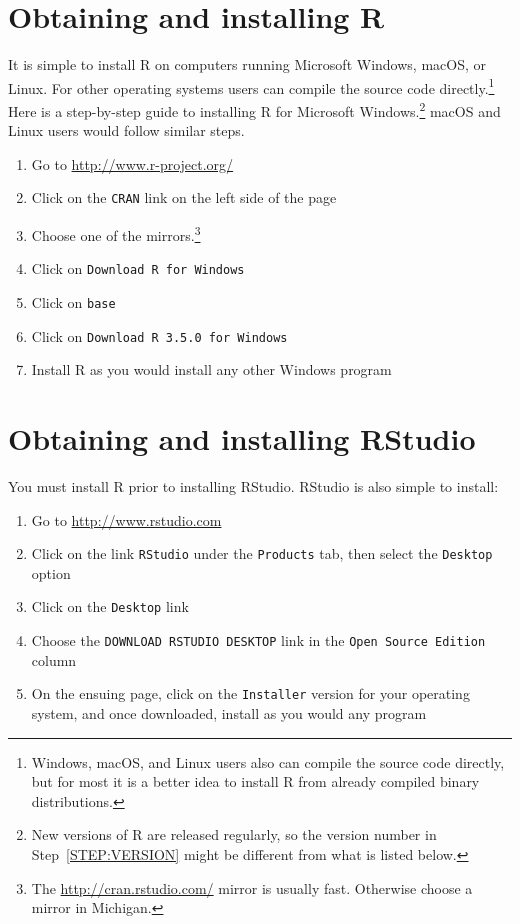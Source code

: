 \documentclass[12pt,oneside]{book}\usepackage[]{graphicx}\usepackage[]{color}
\newcommand{\be}{\begin{enumerate}}
\newcommand{\ee}{\end{enumerate}}
\begin{document}
\section{Obtaining and installing R}
It is simple to install R on computers running Microsoft Windows, macOS, or Linux. For other operating systems users can compile the source code directly.\footnote{Windows, macOS, and Linux users also can compile the source code directly, but for most it is a better idea to install R from already compiled binary distributions.}
Here is a step-by-step guide to installing R for Microsoft Windows.\footnote{New versions of R are released regularly, so the version number in Step~\ref{STEP:VERSION} might be different from what is listed below.} macOS and Linux users would follow similar steps.
\be
  \item Go to \url{http://www.r-project.org/}
  \item Click on the \texttt{CRAN} link on the left side of the page
  \item Choose one of the mirrors.\footnote{The \url{http://cran.rstudio.com/} mirror is usually fast. Otherwise choose a mirror in Michigan.}
  \item Click on \texttt{Download R for Windows}
  \item Click on \texttt{base}
  \item \label{STEP:VERSION} Click on \texttt{Download R 3.5.0 for Windows}
  \item Install R as you would install any other Windows program
\ee
\section{Obtaining and installing RStudio}

You must install R prior to installing RStudio. RStudio is also simple to install:
\begin{enumerate}
  \item Go to \url{http://www.rstudio.com}
  \item Click on the link \texttt{RStudio} under the \texttt{Products} tab, then select the \texttt{Desktop} option
  \item Click on the \texttt{Desktop} link
  \item Choose the \texttt{DOWNLOAD RSTUDIO DESKTOP} link in the \texttt{Open Source Edition} column
  \item On the ensuing page, click on the \texttt{Installer} version for your operating system, and once downloaded, install as you would any program
\end{enumerate}
\end{document}
